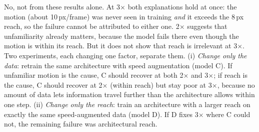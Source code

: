  No, not from these results alone. At 3$\times$ both explanations hold at once: the motion
(about 10\,px/frame) was never seen in training \emph{and} it exceeds the 8\,px reach, so the failure
cannot be attributed to either one. 2$\times$ suggests that unfamiliarity already matters, because the
model fails there even though the motion is within its reach. But it does not show that reach is
irrelevant at 3$\times$. Two experiments, each changing one factor, separate them.
(i) \emph{Change only the data}: retrain the same architecture with speed augmentation (model C). If
unfamiliar motion is the cause, C should recover at both 2$\times$ and 3$\times$; if reach is the cause,
C should recover at 2$\times$ (within reach) but stay poor at 3$\times$, because no amount of data lets
information travel further than the architecture allows within one step.
(ii) \emph{Change only the reach}: train an architecture with a larger reach on exactly the same
speed-augmented data (model D). If D fixes 3$\times$ where C could not, the remaining failure was
architectural reach.



